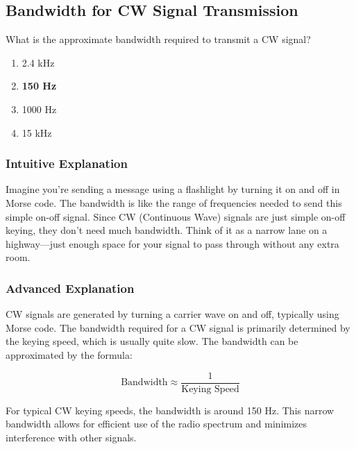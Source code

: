\subsection{Bandwidth for CW Signal Transmission}
\label{T8A11}

\begin{tcolorbox}[colback=gray!10!white,colframe=black!75!black,title=T8A11]
What is the approximate bandwidth required to transmit a CW signal?
\begin{enumerate}[noitemsep]
    \item 2.4 kHz
    \item \textbf{150 Hz}
    \item 1000 Hz
    \item 15 kHz
\end{enumerate}
\end{tcolorbox}

\subsubsection*{Intuitive Explanation}
Imagine you're sending a message using a flashlight by turning it on and off in Morse code. The bandwidth is like the range of frequencies needed to send this simple on-off signal. Since CW (Continuous Wave) signals are just simple on-off keying, they don't need much bandwidth. Think of it as a narrow lane on a highway—just enough space for your signal to pass through without any extra room.

\subsubsection*{Advanced Explanation}
CW signals are generated by turning a carrier wave on and off, typically using Morse code. The bandwidth required for a CW signal is primarily determined by the keying speed, which is usually quite slow. The bandwidth can be approximated by the formula:

\[
\text{Bandwidth} \approx \frac{1}{\text{Keying Speed}}
\]

For typical CW keying speeds, the bandwidth is around 150 Hz. This narrow bandwidth allows for efficient use of the radio spectrum and minimizes interference with other signals.